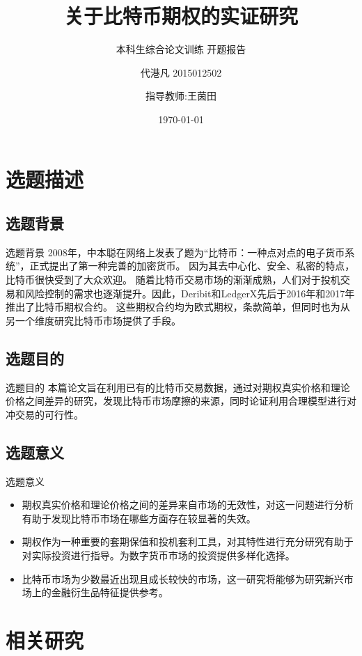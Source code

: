 \documentclass[11pt,dark]{mathbeamer}
\title{关于比特币期权的实证研究 }
\subtitle{本科生综合论文训练 开题报告}
\author[代港凡 2015012502]{代港凡 2015012502 \and 指导教师:王茵田}
\institute{清华大学经济管理学院}
\date{\today}
\begin{document}
\section{选题描述}

\subsection{选题背景}
\begin{frame}{选题背景}
    2008年，中本聪在网络上发表了题为“比特币：一种点对点的电子货币系统”\cite{Nakamoto_bitcoin:a}，正式提出了第一种完善的加密货币。
    因为其去中心化、安全、私密的特点，比特币很快受到了大众欢迎。\newline
    随着比特币交易市场的渐渐成熟，人们对于投机交易和风险控制的需求也逐渐提升。因此，Deribit和LedgerX先后于2016年和2017年推出了比特币期权合约。
    \newline 这些期权合约均为欧式期权，条款简单，但同时也为从另一个维度研究比特币市场提供了手段。
  \end{frame}

\subsection{选题目的}
\begin{frame}{选题目的}
  本篇论文旨在利用已有的比特币交易数据，通过对期权真实价格和理论价格之间差异的研究，发现比特币市场摩擦的来源，同时论证利用合理模型进行对冲交易的可行性。
\end{frame}

\subsection{选题意义}
\begin{frame}{选题意义}
  \begin{itemize}
    \item 期权真实价格和理论价格之间的差异来自市场的无效性，对这一问题进行分析有助于发现比特币市场在哪些方面存在较显著的失效。
    \item 期权作为一种重要的套期保值和投机套利工具，对其特性进行充分研究有助于对实际投资进行指导。为数字货币市场的投资提供多样化选择。
    \item  比特币市场为少数最近出现且成长较快的市场，这一研究将能够为研究新兴市场上的金融衍生品特征提供参考。
  \end{itemize}
\end{frame}


\section{相关研究}
\end{document}
